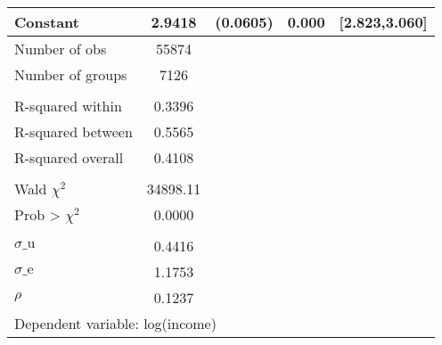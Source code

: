 {\begin{tabular}{l*{1}{cccc}}
Constant            &      2.9418&    (0.0605)&       0.000&[2.823,3.060]\\
\midrule
Number of obs       &       55874&            &            &            \\
Number of groups    &        7126&            &            &            \\
\\ R-squared within &      0.3396&            &            &            \\
R-squared between   &      0.5565&            &            &            \\
R-squared overall   &      0.4108&            &            &            \\
\\ Wald $\chi^2$    &    34898.11&            &            &            \\
Prob > $\chi^2$     &      0.0000&            &            &            \\
\\ $\sigma\text{\_u}$&      0.4416&            &            &            \\
$\sigma\text{\_e}$   &      1.1753&            &            &            \\
$\rho$              &      0.1237&            &            &            \\
\bottomrule
\multicolumn{5}{l}{\footnotesize Dependent variable: log(income)}\\
\end{tabular}
}
